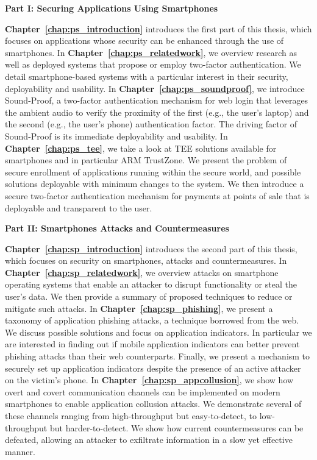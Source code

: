 \vspace*{.5cm}
\noindent\textbf{Part I: Securing Applications Using Smartphones}

\textbf{Chapter~\ref{chap:ps_introduction}} introduces the first part of this thesis, which focuses on applications whose security can be enhanced through the use of smartphones. In \textbf{Chapter~\ref{chap:ps_relatedwork}}, we overview research as well as deployed systems that propose or employ two-factor authentication. We detail smartphone-based systems with a particular interest in their security, deployability and usability. In \textbf{Chapter~\ref{chap:ps_soundproof}}, we introduce Sound-Proof, a two-factor authentication mechanism for web login that leverages the ambient audio to verify the proximity of the first (e.g., the user's laptop) and the second (e.g., the user's phone) authentication factor. The driving factor of Sound-Proof is its immediate deployability and usability.
In \textbf{Chapter~\ref{chap:ps_tee}}, we take a look at TEE solutions available for smartphones and in particular ARM TrustZone. We present the problem of secure enrollment of applications running within the secure world, and possible solutions deployable with minimum changes to the system. We then introduce a secure two-factor authentication mechanism for payments at points of sale that is deployable and transparent to the user.

\vspace*{.5cm}
\noindent\textbf{Part II: Smartphones Attacks and Countermeasures}

\textbf{Chapter~\ref{chap:sp_introduction}} introduces the second part of this thesis, which focuses on security on smartphones, attacks and countermeasures.
In \textbf{Chapter~\ref{chap:sp_relatedwork}}, we overview attacks on smartphone operating systems that enable an attacker to disrupt functionality or steal the user's data. We then provide a summary of proposed techniques to reduce or mitigate such attacks.
In \textbf{Chapter~\ref{chap:sp_phishing}}, we present a taxonomy of application phishing attacks, a technique borrowed from the web. We discuss possible solutions and focus on application indicators. In particular we are interested in finding out if mobile application indicators can better prevent phishing attacks than their web counterparts. Finally, we present a mechanism to securely set up application indicators despite the presence of an active attacker on the victim's phone.
In \textbf{Chapter~\ref{chap:sp_appcollusion}}, we show how overt and covert communication channels can be implemented on modern smartphones to enable application collusion attacks. We demonstrate several of these channels ranging from high-throughput but easy-to-detect, to low-throughput but harder-to-detect. We show how current countermeasures can be defeated, allowing an attacker to exfiltrate information in a slow yet effective manner.

